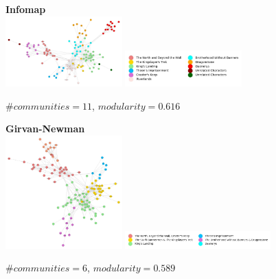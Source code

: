 \documentclass[10pt,twocolumn,letterpaper]{article}
\begin{document}
\begin{figure}[!h]
    \centering
    \textbf{Infomap}  \\
    \includegraphics[width=0.4\textwidth]{img/s3/communities_infomap.jpg}
    \includegraphics[width=0.4\textwidth]{img/s3/infomap_legend.jpg}\\
    \caption{\small{$\#communities=11$, $modularity=0.616$}}
    \label{fig:infomap_s3}
    \vspace{2.5cm}
\end{figure}

\begin{figure}[!h]
    \centering
    \textbf{Girvan-Newman} \\
    \includegraphics[width=0.4\textwidth]{img/s3/communities_g-n.jpg}
    \includegraphics[width=0.5\textwidth]{img/s3/g-n_legend.jpg}\\
    \caption{\small{$\#communities=6$, $modularity=0.589$}}
    \label{fig:gn_s3}
    \vspace{2cm}
\end{figure}
\end{document}

